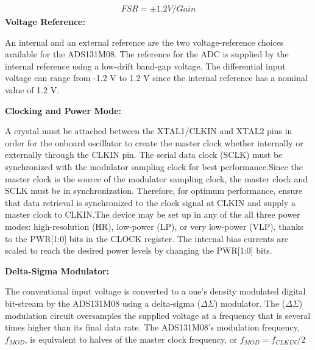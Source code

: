 \begin{align} \label{eqn}
    FSR = \pm 1.2 V / Gain
\end{align}
\textbf{Voltage Reference:}  \par
An internal and an external reference are the two voltage-reference choices available for the ADS131M08. The reference for the ADC is supplied by the internal reference using a low-drift band-gap voltage. The differential input voltage can range from -1.2 V to 1.2 V since the internal reference has a nominal value of 1.2 V. 
\vspace{1\baselineskip}\par 
\textbf{Clocking and Power Mode:}  \par
A crystal must be attached between the XTAL1/CLKIN and XTAL2 pins in order for the onboard oscillator to create the master clock whether internally or externally through the CLKIN pin.  The serial data clock (SCLK) must be synchronized with the modulator sampling clock for best performance.Since the master clock is the source of the modulator sampling clock, the master clock and SCLK must be in synchronization.  Therefore, for optimum performance, ensure that data retrieval is synchronized to the clock signal at CLKIN and supply a master clock to CLKIN.The device may be set up in any of the all three power modes: high-resolution (HR), low-power (LP), or very low-power (VLP), thanks to the PWR[1:0] bits in the CLOCK register. The internal bias currents are scaled to reach the desired power levels by changing the PWR[1:0] bits.

 
\vspace{1\baselineskip}\par 
\textbf{Delta-Sigma Modulator:}  \par
The conventional input voltage is converted to a one's density modulated digital bit-stream by the ADS131M08 using a delta-sigma ($\Delta\Sigma$) modulator. The ($\Delta\Sigma$) modulation circuit oversamples the supplied voltage at a frequency that is several times higher than its final data rate. The ADS131M08's modulation frequency, $f_{MOD}$, is equivalent to halves of the master clock frequency, or $f_{MOD} = f_{CLKIN} / 2$

